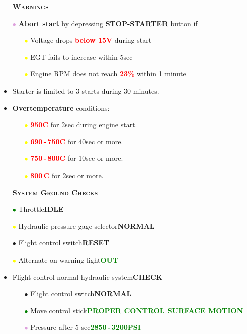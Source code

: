 \documentclass[a4paper,12pt,dvipsnames]{letter}
\newcommand{\button}[1]{\textbf{#1}}
\newcommand{\degC}{\textdegree{}C}
\newcommand{\ok}[1]{\textcolor{Green}{\textbf{#1}}}
\newcommand{\warn}[1]{\textcolor{Red}{\textbf{#1}}}
\newcommand{\myHead}[1]{{\LARGE\textsc{\textbf{#1}}}}
\newcommand{\myhead}[1]{{\large\textsc{\textbf{#1}}}}
\newcommand{\gi}{\textcolor{Green}{$\bullet$\;}}
\newcommand{\yi}{\textcolor{Yellow}{$\bullet$\;}}
\newcommand{\vi}{\textcolor{Plum}{$\bullet$\;}}
\newcommand{\ai}{\textcolor{Apricot}{$\bullet$\;}}
\begin{document}
{\begin{itemize}
\end{itemize}
\begin{itemize}
\item[] \myhead{Warnings}
\item[\vi] \textbf{Abort start} by depressing \button{STOP-STARTER} button if
\begin{itemize}
  \item[\yi] Voltage drops \warn{below 15\;V} during start
  \item[\yi] EGT fails to increase within 5\;sec
  \item[\yi] Engine RPM does not reach \warn{23\%} within 1 minute
\end{itemize}
\item Starter is limited to 3 starts during 30 minutes.
\item \textbf{Overtemperature} conditions:
\begin{itemize}
\item[\yi] \warn{950\degC} for 2\;sec during engine start.
\item[\yi] \warn{690\,-\,750\degC} for 40\;sec or more.
\item[\yi] \warn{750\,-\,800\degC} for 10\;sec or more.
\item[\yi] \warn{800\,\degC} for 2\;sec or more.
\end{itemize}
\end{itemize}
\newpage
\begin{itemize}
\item[] \myHead{System Ground Checks}
\item[\gi] Throttle\dotfill\button{IDLE}
\item[\yi] Hydraulic pressure gage selector\dotfill\button{NORMAL}
\item[\ai] Flight control switch\dotfill\button{RESET}
\item[\yi] Alternate-on warning light\dotfill\ok{OUT}
\item Flight control normal hydraulic system\dotfill\button{CHECK}
\begin{itemize}
 \item[\ai] Flight control switch\dotfill\button{NORMAL}
 \item[\gi] Move control stick\dotfill\ok{PROPER CONTROL SURFACE MOTION}
 \item[\vi] Pressure after 5 sec\dotfill\ok{2850\,-\,3200\;PSI}

\end{itemize}
\end{itemize}}
\end{document}
